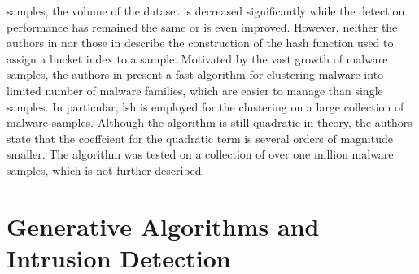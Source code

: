 \documentclass[../../main.tex]{subfiles}
\begin{document}
samples, the volume of the dataset is decreased significantly while the detection performance has remained the same or is even improved. However, neither the authors in \cite{baldini2021intrusion} nor those in \cite{aslani2020fast} describe the construction of the hash function used to assign a bucket index to a sample. Motivated by the vast growth of malware samples, the authors in \cite{opricsa2014locality} present a fast algorithm for clustering malware into limited number of malware families, which are easier to manage than single samples. In particular, \gls{lsh} is employed for the clustering on a large collection of malware samples. Although the algorithm is still quadratic in theory, the authors state that the coeffcient for the quadratic term is several orders of magnitude smaller. The algorithm was tested on a collection of over one million malware samples, which is not further described.

\section{Generative Algorithms and Intrusion Detection}\label{sec:generative_algorithms_ids}
\end{document}
